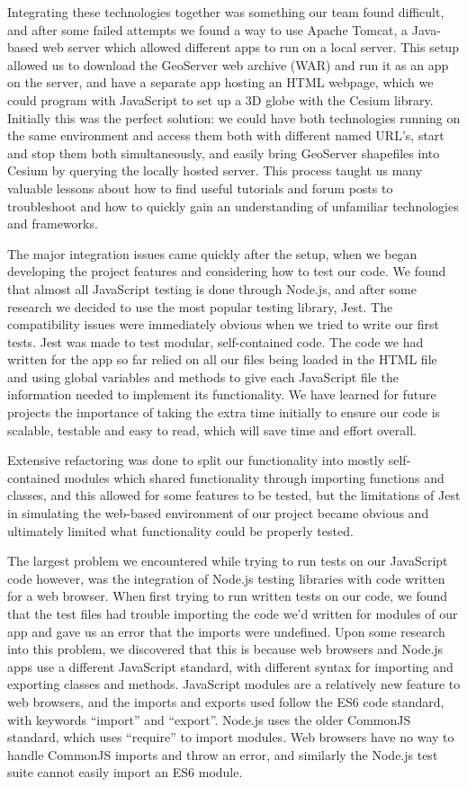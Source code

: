 \documentclass{l3proj}
\begin{document}
Integrating these technologies together was something our team found difficult, and after some failed attempts we found a way to use Apache Tomcat, a Java-based web server which allowed different apps to run on a local server\cite{Tomcat}. This setup allowed us to download the GeoServer web archive (WAR) and run it as an app on the server, and have a separate app hosting an HTML webpage, which we could program with JavaScript to set up a 3D globe with the Cesium library. Initially this was the perfect solution: we could have both technologies running on the same environment and access them both with different named URL’s, start and stop them both simultaneously, and easily bring GeoServer shapefiles into Cesium by querying the locally hosted server. This process taught us many valuable lessons about how to find useful tutorials and forum posts to troubleshoot and how to quickly gain an understanding of unfamiliar technologies and frameworks.

The major integration issues came quickly after the setup, when we began developing the project features and considering how to test our code. We found that almost all JavaScript testing is done through Node.js, and after some research we decided to use the most popular testing library, Jest. The compatibility issues were immediately obvious when we tried to write our first tests. Jest was made to test modular, self-contained code. The code we had written for the app so far relied on all our files being loaded in the HTML file and using global variables and methods to give each JavaScript file the information needed to implement its functionality. We have learned for future projects the importance of taking the extra time initially to ensure our code is scalable, testable and easy to read, which will save time and effort overall.

Extensive refactoring was done to split our functionality into mostly self-contained modules which shared functionality through importing functions and classes, and this allowed for some features to be tested, but the limitations of Jest in simulating the web-based environment of our project became obvious and ultimately limited what functionality could be properly tested.

The largest problem we encountered while trying to run tests on our JavaScript code however, was the integration of Node.js testing libraries with code written for a web browser. When first trying to run written tests on our code, we found that the test files had trouble importing the code we’d written for modules of our app and gave us an error that the imports were undefined. Upon some research into this problem, we discovered that this is because web browsers and Node.js apps use a different JavaScript standard, with different syntax for importing and exporting classes and methods. JavaScript modules are a relatively new feature to web browsers, and the imports and exports used follow the ES6 code standard, with keywords “import” and “export”. Node.js uses the older CommonJS standard, which uses “require” to import modules. Web browsers have no way to handle CommonJS imports and throw an error, and similarly the Node.js test suite cannot easily import an ES6 module\cite{CommonVsES6}. 
\end{document}
